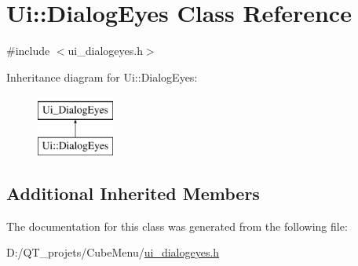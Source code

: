 \hypertarget{class_ui_1_1_dialog_eyes}{}\section{Ui\+:\+:Dialog\+Eyes Class Reference}
\label{class_ui_1_1_dialog_eyes}


{\ttfamily \#include $<$ui\+\_\+dialogeyes.\+h$>$}

Inheritance diagram for Ui\+:\+:Dialog\+Eyes\+:\begin{figure}[H]
\begin{center}
\leavevmode
\includegraphics[height=2.000000cm]{class_ui_1_1_dialog_eyes}
\end{center}
\end{figure}
\subsection*{Additional Inherited Members}


The documentation for this class was generated from the following file\+:\begin{DoxyCompactItemize}
\item 
D\+:/\+Q\+T\+\_\+projets/\+Cube\+Menu/\hyperlink{ui__dialogeyes_8h}{ui\+\_\+dialogeyes.\+h}\end{DoxyCompactItemize}
